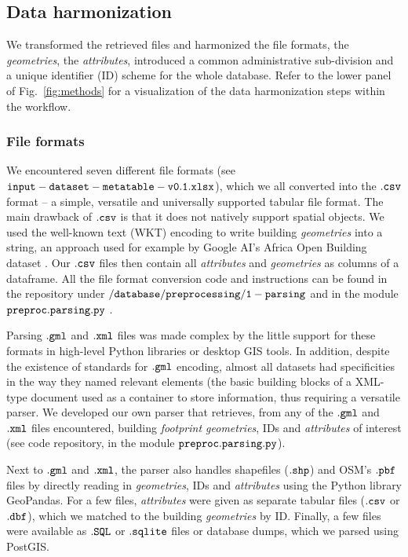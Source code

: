 \documentclass[fleqn,10pt]{wlscirep}
\begin{document}
\subsection*{Data harmonization}

We transformed the retrieved files and harmonized the file formats, the \textit{geometries}, the \textit{attributes}, introduced a common administrative sub-division and a unique identifier (ID) scheme for the whole database.  Refer to the lower panel of Fig.~\ref{fig:methods} for a visualization of the data harmonization steps within the workflow.

\subsubsection*{File formats}

We encountered seven different file formats (see ${\tt input-dataset-metatable-v0.1.xlsx}$), which we all converted into the $\tt{.csv}$ format -- a simple, versatile and universally supported tabular file format. The main drawback of $\tt{.csv}$ is that it does not natively support spatial objects. We used the well-known text (WKT) encoding to write building \textit{geometries} into a string, an approach used for example by Google AI's Africa Open Building dataset \cite{sirko2021continental}. Our $\tt{.csv}$ files then contain all \textit{attributes} and \textit{geometries} as columns of a dataframe. All the file format conversion code and instructions can be found in the repository under $\tt{/database/preprocessing/1-parsing}$ and in the module $\tt{preproc.parsing.py}$ \cite{eubucco-0.1-code2022}. 

Parsing $\tt{.gml}$ and $\tt{.xml}$ files was made complex by the little support for these formats in high-level Python libraries or desktop GIS tools. In addition, despite the existence of standards for $\tt{.gml}$ encoding, almost all datasets had specificities in the way they named relevant elements (the basic building blocks of a XML-type document used as a container to store information, thus requiring a versatile parser. We developed our own parser that retrieves, from any of the $\tt{.gml}$ and $\tt{.xml}$ files encountered, building \textit{footprint geometries}, IDs and \textit{attributes} of interest (see code repository\cite{eubucco-0.1-code2022}, in the module $\tt{preproc.parsing.py}$). 

Next to $\tt{.gml}$ and $\tt{.xml}$, the parser also handles shapefiles ($\tt{.shp}$) and OSM's $\tt{.pbf}$ files by directly reading in \textit{geometries}, IDs and \textit{attributes} using the Python library GeoPandas\cite{kelsey_jordahl_2019_2585849}. For a few files, \textit{attributes} were given as separate tabular files ($\tt{.csv}$ or $\tt{.dbf}$), which we matched to the building \textit{geometries} by ID. Finally, a few files were available as $\tt{.SQL}$ or $\tt{.sqlite}$ files or database dumps, which we parsed using PostGIS.
\end{document}
